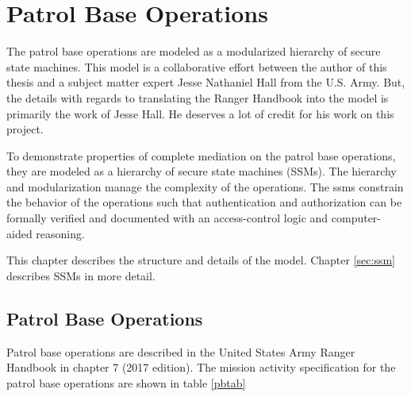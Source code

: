 \documentclass[../../main/main.tex]{subfiles}
\begin{document}
\chapter{Patrol Base Operations}\label{chp:pb}
The patrol base operations are modeled as a modularized hierarchy of secure state machines.  This model is a collaborative effort between the author of this thesis and a subject matter expert Jesse Nathaniel Hall from the U.S. Army.  But, the details with regards to translating the Ranger Handbook into the model is primarily the work of Jesse Hall.  He deserves a lot of credit for his work on this project.  

To demonstrate properties of complete mediation on the patrol base operations, they are modeled as a hierarchy of secure state machines (SSMs). The hierarchy and modularization manage the complexity of the operations.  The \glspl{ssm} constrain the behavior of the operations such that authentication and authorization can be formally verified and documented with an access-control logic and computer-aided reasoning.

This chapter describes the structure and details of the model.  Chapter  \ref{sec:ssm} describes SSMs in more detail.

\section{Patrol Base Operations}
Patrol base operations are described in the United States Army Ranger Handbook \cite{rangermanual} in chapter 7 (2017 edition).  The mission activity specification for the patrol base operations are shown in table \ref{pbtab}
\end{document}
